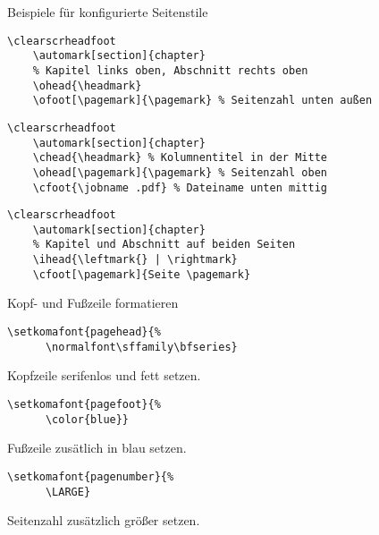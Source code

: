\begin{Frame}[fragile]{Beispiele für konfigurierte Seitenstile}
  \begin{lstlisting}[gobble=4]
    \clearscrheadfoot
    \automark[section]{chapter}
    % Kapitel links oben, Abschnitt rechts oben
    \ohead{\headmark}
    \ofoot[\pagemark]{\pagemark} % Seitenzahl unten außen
  \end{lstlisting}

  \xxx\pause

  \begin{lstlisting}[gobble=4]
    \clearscrheadfoot
    \automark[section]{chapter}
    \chead{\headmark} % Kolumnentitel in der Mitte
    \ohead[\pagemark]{\pagemark} % Seitenzahl oben
    \cfoot{\jobname .pdf} % Dateiname unten mittig
  \end{lstlisting}

  \xxx\pause

  \begin{lstlisting}[gobble=4]
    \clearscrheadfoot
    \automark[section]{chapter}
    % Kapitel und Abschnitt auf beiden Seiten
    \ihead{\leftmark{} | \rightmark}
    \cfoot[\pagemark]{Seite \pagemark}
  \end{lstlisting}
\end{Frame}

\begin{Frame}[fragile]{Kopf- und Fußzeile formatieren}
  \begin{lstlisting}[gobble=4]
    \setkomafont{pagehead}{%
      \normalfont\sffamily\bfseries}
  \end{lstlisting}
  Kopfzeile serifenlos und fett setzen.

  \xxx

  \begin{lstlisting}[gobble=4]
    \setkomafont{pagefoot}{%
      \color{blue}}
  \end{lstlisting}
  Fußzeile \alert{zusätlich} in blau setzen.

  \xxx

  \begin{lstlisting}[gobble=4]
    \setkomafont{pagenumber}{%
      \LARGE}
  \end{lstlisting}
  Seitenzahl \alert{zusätzlich} größer setzen.
\end{Frame}

